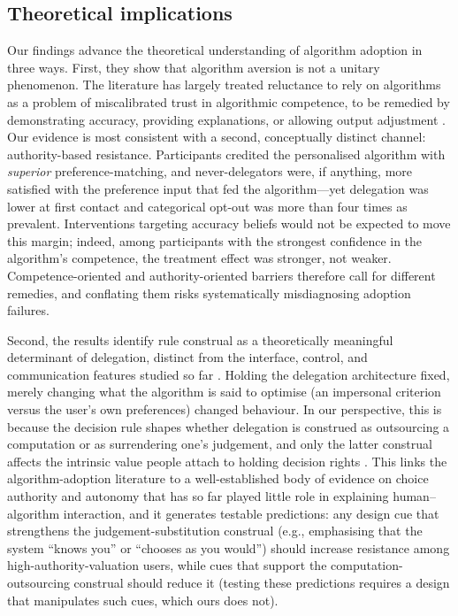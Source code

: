 \documentclass[a4paper, 12pt, fleqn]{article}
\theoremstyle{hypstyle}
\begin{document}
\subsection{Theoretical implications}
Our findings advance the theoretical understanding of algorithm adoption in three ways.
First, they show that algorithm aversion is not a unitary phenomenon. The literature has largely treated reluctance to rely on algorithms as a problem of miscalibrated trust in algorithmic competence, to be remedied by demonstrating accuracy, providing explanations, or allowing output adjustment \citep{Dietvorst2018,Yeomans2019,Leichtmann2023}. Our evidence is most consistent with a second, conceptually distinct channel: authority-based resistance. Participants credited the personalised algorithm with \emph{superior} preference-matching, and never-delegators were, if anything, more satisfied with the preference input that fed the algorithm---yet delegation was lower at first contact and categorical opt-out was more than four times as prevalent. Interventions targeting accuracy beliefs would not be expected to move this margin; indeed, among participants with the strongest confidence in the algorithm's competence, the treatment effect was stronger, not weaker. Competence-oriented and authority-oriented barriers therefore call for different remedies, and conflating them risks systematically misdiagnosing adoption failures.

Second, the results identify rule construal as a theoretically meaningful determinant of delegation, distinct from the interface, control, and communication features studied so far \citep{Dietvorst2018,Hildebrand2021,Fink2024}. Holding the delegation architecture fixed, merely changing what the algorithm is said to optimise (an impersonal criterion versus the user's own preferences) changed behaviour. In our perspective, this is because the decision rule shapes whether delegation is construed as outsourcing a computation or as surrendering one's judgement, and only the latter construal affects the intrinsic value people attach to holding decision rights \citep{Bartling2014,Owens2014,FreyBenzStutzer2004}. This links the algorithm-adoption literature to a well-established body of evidence on choice authority and autonomy \citep{Brehm1966,DeciRyan2000,Leotti2010} that has so far played little role in explaining human--algorithm interaction, and it generates testable predictions: any design cue that strengthens the judgement-substitution construal (e.g., emphasising that the system ``knows you'' or ``chooses as you would'') should increase resistance among high-authority-valuation users, while cues that support the computation-outsourcing construal should reduce it (testing these predictions requires a design that manipulates such cues, which ours does not).
\end{document}
